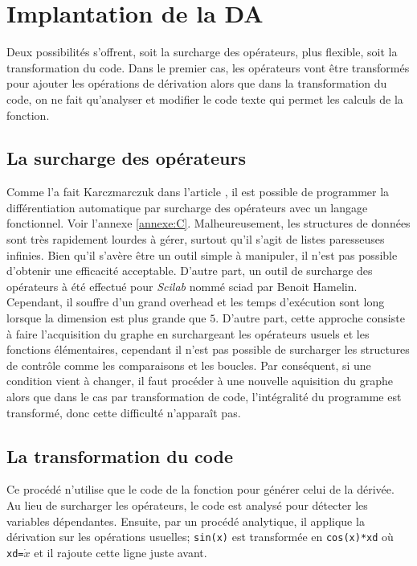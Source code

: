 \section{Implantation de la DA}

Deux possibilit\'es s'offrent, soit la surcharge des op\'erateurs, plus flexible, soit la transformation du code.
Dans le premier cas, les op\'erateurs vont être transform\'es pour ajouter les op\'erations de d\'erivation alors que dans
la transformation du code, on ne fait qu'analyser et modifier le code texte qui permet les calculs de la fonction.



\subsection{La surcharge des op\'erateurs}
{\co
Comme l'a fait Karczmarczuk dans l'article \cite{paresseuse}, il est possible de programmer la diff\'erentiation automatique 
par surcharge des op\'erateurs avec un langage fonctionnel. Voir l'annexe \ref{annexe:C}. Malheureusement, les structures de donn\'ees 
sont tr\`es rapidement lourdes \`a g\'erer, surtout qu'il s'agit de listes paresseuses infinies. Bien qu'il s'av\`ere être un outil simple \`a 
manipuler, il n'est pas possible d'obtenir une efficacit\'e acceptable. D'autre part, un outil de surcharge des op\'erateurs \`a \'et\'e effectu\'e
pour {\it Scilab} nomm\'e sciad par Benoit Hamelin. Cependant, il souffre d'un grand overhead et les temps d'ex\'ecution sont long lorsque
la dimension est plus grande que $5$. D'autre part, cette approche consiste \`a faire l'acquisition du graphe en surchargeant les op\'erateurs usuels
et les fonctions \'el\'ementaires, cependant il n'est pas possible de surcharger les structures de contrôle comme les comparaisons et les boucles.
Par cons\'equent, si une condition vient \`a changer, il faut proc\'eder \`a une nouvelle aquisition du graphe alors que dans le cas par 
transformation de code, l'int\'egralit\'e du programme est transform\'e, donc cette difficult\'e n'apparaît pas.}



\subsection{La transformation du code}
Ce proc\'ed\'e n'utilise que le code de la fonction pour g\'en\'erer celui de la d\'eriv\'ee.
Au lieu de surcharger les op\'erateurs, le code est analys\'e pour d\'etecter les variables d\'ependantes.
Ensuite, par un proc\'ed\'e analytique, il applique la d\'erivation sur les op\'erations usuelles; 
{\tt sin(x)} est transform\'ee en {\tt cos(x)*xd} o\`u {\tt xd=}$\dot x$ et il rajoute cette ligne
juste avant.

